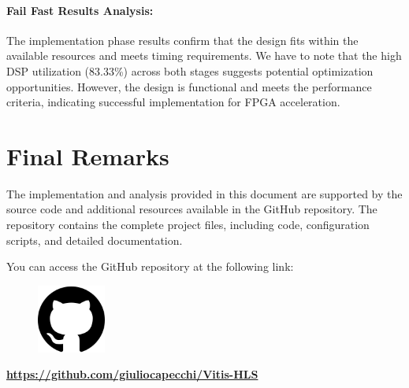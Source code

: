 \documentclass{article}
\begin{document}
\paragraph{Fail Fast Results Analysis:}
The implementation phase results confirm that the design fits within the available resources and meets timing requirements. We have to note that the high DSP utilization (83.33\%) across both stages suggests potential optimization opportunities. However, the design is functional and meets the performance criteria, indicating successful implementation for FPGA acceleration.

\newpage
\section*{Final Remarks}

The implementation and analysis provided in this document are supported by the source code and additional resources available in the GitHub repository. The repository contains the complete project files, including code, configuration scripts, and detailed documentation.

\noindent You can access the GitHub repository at the following link:

\begin{figure}[H]
    \centering
    \includegraphics[width=0.2\textwidth]{assets/github-logo.png}
    \label{fig:github}
\end{figure}

\begin{center}
\textbf{\url{https://github.com/giuliocapecchi/Vitis-HLS}} 
\end{center}
\end{document}

